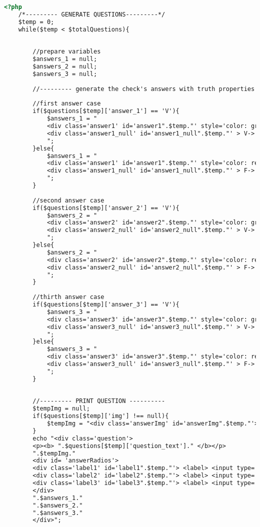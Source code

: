 \begin{lstlisting}[language=html]
	<?php
	/*--------- GENERATE QUESTIONS---------*/
	$temp = 0;
	while($temp < $totalQuestions){
		
		
		//prepare variables
		$answers_1 = null;
		$answers_2 = null;
		$answers_3 = null;
		
		//--------- generate the check's answers with truth properties ----------
		
		//first answer case
		if($questions[$temp]['answer_1'] == 'V'){
			$answers_1 = "
			<div class='answer1' id='answer1".$temp."' style='color: green'> V-> ".$questions[$temp]['answer_text_1']." </div>
			<div class='answer1_null' id='answer1_null".$temp."' > V-> ".$questions[$temp]['answer_text_1']." </div>
			";
		}else{
			$answers_1 = "
			<div class='answer1' id='answer1".$temp."' style='color: red'> F-> ".$questions[$temp]['answer_text_1']." </div>
			<div class='answer1_null' id='answer1_null".$temp."' > F-> ".$questions[$temp]['answer_text_1']." </div>
			";
		}
		
		//second answer case
		if($questions[$temp]['answer_2'] == 'V'){
			$answers_2 = "
			<div class='answer2' id='answer2".$temp."' style='color: green'> V-> ".$questions[$temp]['answer_text_2']." </div>
			<div class='answer2_null' id='answer2_null".$temp."' > V-> ".$questions[$temp]['answer_text_2']." </div>
			";
		}else{
			$answers_2 = "
			<div class='answer2' id='answer2".$temp."' style='color: red'> F-> ".$questions[$temp]['answer_text_2']." </div>
			<div class='answer2_null' id='answer2_null".$temp."' > F-> ".$questions[$temp]['answer_text_2']." </div>
			";
		}
		
		//thirth answer case
		if($questions[$temp]['answer_3'] == 'V'){
			$answers_3 = "
			<div class='answer3' id='answer3".$temp."' style='color: green'> V-> ".$questions[$temp]['answer_text_3']." </div>
			<div class='answer3_null' id='answer3_null".$temp."' > V-> ".$questions[$temp]['answer_text_3']." </div>
			";
		}else{
			$answers_3 = "
			<div class='answer3' id='answer3".$temp."' style='color: red'> F-> ".$questions[$temp]['answer_text_3']." </div>
			<div class='answer3_null' id='answer3_null".$temp."' > F-> ".$questions[$temp]['answer_text_3']." </div>
			";
		}
		
		
		//--------- PRINT QUESTION ----------
		$tempImg = null;
		if($questions[$temp]['img'] !== null){
			$tempImg = "<div class='answerImg' id='answerImg".$temp."'> <img src='data:image/jpeg;base64,".base64_encode($questions[$temp]['img'])."'/> </div>";
		}
		echo "<div class='question'>
		<p><b> ".$questions[$temp]['question_text']." </b></p>
		".$tempImg."
		<div id= 'answerRadios'>
		<div class='label1' id='label1".$temp."'> <label> <input type='radio' name='radio".$temp."' id='radio1".$temp."' > ".$questions[$temp]['answer_text_1']." </label> </div>
		<div class='label2' id='label2".$temp."'> <label> <input type='radio' name='radio".$temp."' id='radio2".$temp."' > ".$questions[$temp]['answer_text_2']." </label> </div>
		<div class='label3' id='label3".$temp."'> <label> <input type='radio' name='radio".$temp."' id='radio3".$temp."' > ".$questions[$temp]['answer_text_3']." </label> </div>
		</div>
		".$answers_1."
		".$answers_2."
		".$answers_3."
		</div>";
		

\end{lstlisting}
